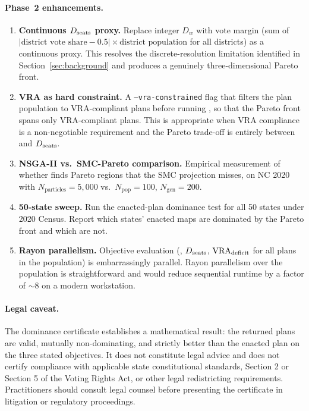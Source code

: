 \paragraph{Phase~2 enhancements.}

\begin{enumerate}
\item \textbf{Continuous $D_{\mathrm{seats}}$ proxy.}
  Replace integer $D_w$ with vote margin (sum of $|\text{district vote share} -
  0.5| \times \text{district population}$ for all districts) as a continuous
  proxy.
  This resolves the discrete-resolution limitation identified in
  Section~\ref{sec:background} and produces a genuinely three-dimensional
  Pareto front.

\item \textbf{VRA as hard constraint.}
  A \texttt{--vra-constrained} flag that filters the plan population to
  VRA-compliant plans before running \nsga{}, so that the Pareto front
  spans only VRA-compliant plans.
  This is appropriate when VRA compliance is a non-negotiable requirement
  and the Pareto trade-off is entirely between \EC{} and $D_{\mathrm{seats}}$.

\item \textbf{NSGA-II vs.\ SMC-Pareto comparison.}
  Empirical measurement of whether \nsga{} finds Pareto regions that
  the SMC projection misses, on NC 2020 with $N_{\mathrm{particles}} = 5{,}000$
  vs.\ $N_{\mathrm{pop}} = 100$, $N_{\mathrm{gen}} = 200$.

\item \textbf{50-state sweep.}
  Run the enacted-plan dominance test for all 50 states under 2020 Census.
  Report which states' enacted maps are dominated by the \nsga{} Pareto front
  and which are not.

\item \textbf{Rayon parallelism.}
  Objective evaluation (\EC{}, $D_{\mathrm{seats}}$, $\mathrm{VRA}_{\mathrm{deficit}}$ for all plans in the
  population) is embarrassingly parallel.
  Rayon parallelism over the population is straightforward and would
  reduce sequential runtime by a factor of $\sim$8 on a modern workstation.
\end{enumerate}

\paragraph{Legal caveat.}
The dominance certificate establishes a mathematical result: the returned
plans are valid, mutually non-dominating, and strictly better than the
enacted plan on the three stated objectives.
It does not constitute legal advice and does not certify compliance with
applicable state constitutional standards, Section 2 or Section 5 of the
Voting Rights Act, or other legal redistricting requirements.
Practitioners should consult legal counsel before presenting the certificate
in litigation or regulatory proceedings.

